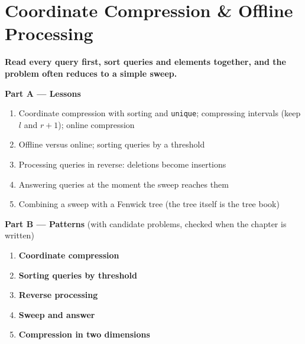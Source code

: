 \chapter{Coordinate Compression \& Offline Processing}
\label{ch:offline}

\begin{tcolorbox}[enhanced, colback=white, colframe=secondaryblue, boxrule=1pt, arc=2mm]
\textbf{\large\textcolor{primaryblue}{Read every query first, sort queries and elements together, and the problem often reduces to a simple sweep.}}
\end{tcolorbox}


\begin{plannedbox}
\textbf{Part A --- Lessons}
\begin{enumerate}[leftmargin=*, label=\textbf{A\arabic*.}, itemsep=1pt]
    \item Coordinate compression with sorting and \texttt{unique}; compressing intervals (keep $l$ and $r+1$); online compression
    \item Offline versus online; sorting queries by a threshold
    \item Processing queries in reverse: deletions become insertions
    \item Answering queries at the moment the sweep reaches them
    \item Combining a sweep with a Fenwick tree (the tree itself is the tree book)
\end{enumerate}
\textbf{Part B --- Patterns} (with candidate problems, checked when the chapter is written)
\begin{enumerate}[leftmargin=*, label=\textbf{P\arabic*.}, itemsep=1pt]
    \item \textbf{Coordinate compression}
    \item \textbf{Sorting queries by threshold}
    \item \textbf{Reverse processing}
    \item \textbf{Sweep and answer}
    \item \textbf{Compression in two dimensions}
\end{enumerate}
\end{plannedbox}

